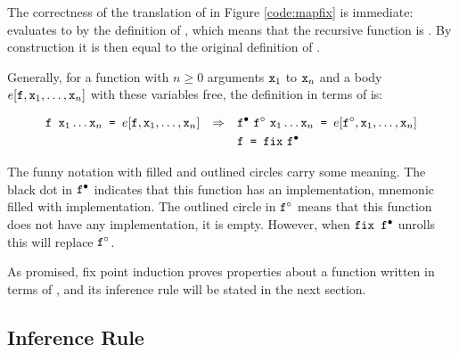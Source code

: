 The correctness of the translation of  in Figure
\ref{code:mapfix} is immediate:  evaluates to  by the definition of , which means that the
recursive function  is . By construction it is then
equal to the original definition of .

Generally, for a function  with $n \geq 0$ arguments $\texttt{x}_1$
to $\texttt{x}_n$ and a body $e[\texttt{f},\texttt{x}_1,\ldots,\texttt{x}_n]$ with
these variables free, the definition in terms of  is:

\begin{align*}
& \texttt{f } \texttt{x}_1 \ldots \texttt{x}_n \texttt{ = } e[\texttt{f},\texttt{x}_1,\ldots,\texttt{x}_n] & \Rightarrow &&& \texttt{f}^{\bullet} \,\, \texttt{f}^{\circ} \,\, \texttt{x}_1 \ldots \texttt{x}_n \texttt{ = } e[\texttt{f}^{\circ},\texttt{x}_1,\ldots,\texttt{x}_n] \\
&                                                                     &             &&& \texttt{f = fix} \,\, \texttt{f}^{\bullet}
\end{align*}

The funny notation with filled and outlined circles carry some
meaning. The black dot in $\texttt{f}^{\bullet}$ indicates that this function
has an implementation, mnemonic filled with implementation. The
outlined circle in $\texttt{f}^{\circ}$ means that this function does not have
any implementation, it is empty. However, when $\texttt{fix }\texttt{f}^{\bullet}$
unrolls this will replace $\texttt{f}^{\circ}$.

\begin{comment}
This translation needs to be carried out with some care, since for $f
\, \overline{x} = e(\overline{x},f)$, it is also possible that $f$ is
called in bodies of other functions. These are of two kinds: either
this function is also called from $f$, making it recursive, or another
function which is not called from $f$, but makes use of $f$
anyway. The first example, with a recursive call, the body needs to be
edited so $f$ becomes translated (to $\bot$, $\unfix{f}$ or
$\tofix{f}$), and the second case should use the original $f$. The
transitive closure of the call graph is calculated, and every
appropriate calls of $f$ are replaced.
\end{comment}

As promised, fix point induction proves properties about a function written in terms
of , and its inference rule will be stated in the next section.

\subsection{Inference Rule}

